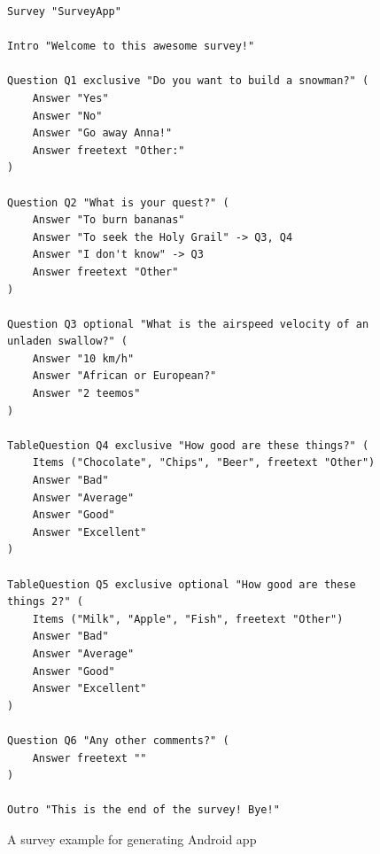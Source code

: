 \documentclass[runningheads,a4paper]{llncs}
\begin{document}
\newpage
\begin{figure}[htb]
\begin{lstlisting}[language=survey]
Survey "SurveyApp"

Intro "Welcome to this awesome survey!"

Question Q1 exclusive "Do you want to build a snowman?" (
	Answer "Yes"
	Answer "No"
	Answer "Go away Anna!"
	Answer freetext "Other:"
)

Question Q2 "What is your quest?" (
	Answer "To burn bananas"
	Answer "To seek the Holy Grail" -> Q3, Q4
	Answer "I don't know" -> Q3
	Answer freetext "Other"
)

Question Q3 optional "What is the airspeed velocity of an unladen swallow?" (
	Answer "10 km/h"
	Answer "African or European?"
	Answer "2 teemos"
)

TableQuestion Q4 exclusive "How good are these things?" (
	Items ("Chocolate", "Chips", "Beer", freetext "Other")
	Answer "Bad"
	Answer "Average"
	Answer "Good"
	Answer "Excellent"
)

TableQuestion Q5 exclusive optional "How good are these things 2?" (
	Items ("Milk", "Apple", "Fish", freetext "Other")
	Answer "Bad"
	Answer "Average"
	Answer "Good"
	Answer "Excellent"
)

Question Q6 "Any other comments?" (
	Answer freetext ""
)

Outro "This is the end of the survey! Bye!"
\end{lstlisting}
\caption{A survey example for generating Android app}
\label{fig:survey_example_android}
\end{figure}
\end{document}
